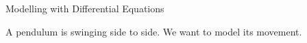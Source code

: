 

\begin{module}{Modelling with Differential Equations}
	\label{model-odes}

	
	
\end{module}



\begin{lesson}

%	
%
%	

\end{lesson}




\newpage

\question \label{pendulum}
	A pendulum is swinging side to side. We want to model its movement.

